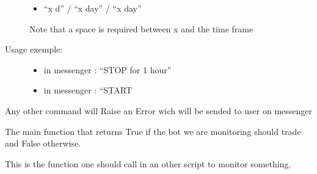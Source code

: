 \documentclass[letterpaper,10pt,english]{sphinxmanual}
\begin{document}
\begin{fulllineitems}
\begin{description}
\begin{itemize}
\item {} 
\sphinxAtStartPar
“x d” / “x day” / “x day”

\end{itemize}

\sphinxAtStartPar
Note that a space is required between x and the time frame

\item[{Usage exemple:}] \leavevmode\begin{itemize}
\item {} 
\sphinxAtStartPar
in messenger : “STOP for 1 hour”

\item {} 
\sphinxAtStartPar
in messenger : “START

\end{itemize}

\end{description}

\sphinxAtStartPar
Any other command will Raise an Error wich will be sended to user on messenger

\begin{fulllineitems}
\label{\detokenize{my_tools.monitoring:my_tools.monitoring.bot.Monitor_Bot.monitor}}
\sphinxAtStartPar
The main function that returns True if the bot we are monitoring should trade
and False otherwise.

\sphinxAtStartPar
This is the function one should call in an other script to monitor something.

\end{fulllineitems}


\end{fulllineitems}

\end{document}
